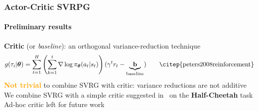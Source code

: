 \documentclass[aspectratio=169]{beamer}
\newcommand{\enb}[1]{\textcolor{poliblue1}{\textbf{#1}}}
\newcommand{\eno}[1]{\textcolor{orange}{\textbf{#1}}}
\newcommand{\vtheta}{\boldsymbol{\theta}}
\begin{document}
\begin{frame} 
\frametitle{Actor-Critic SVRPG}
\framesubtitle{Preliminary results}

\enb{Critic} (or \textit{baseline}): an orthogonal variance-reduction technique
\begin{equation*}
	g(\tau_i\vert\vtheta) = \sum_{t=1}^{H}\left(\sum_{k=1}^t\nabla\log\pi_{\vtheta}(a_t\vert s_t)\right)(\gamma^tr_t - \underbrace{\mathbf{b}}_{\text{baseline}})\qquad\text{\citep{peters2008reinforcement}}
\end{equation*}
\vfill
\eno{Not trivial} to combine SVRG with critic: variance reductions are not additive\\
\vfill
We combine SVRG with a simple critic suggested in~\citet{duan2016benchmarking} on the \textbf{Half-Cheetah} task\\
\vfill
Ad-hoc critic left for future work

\end{frame}
\end{document}

